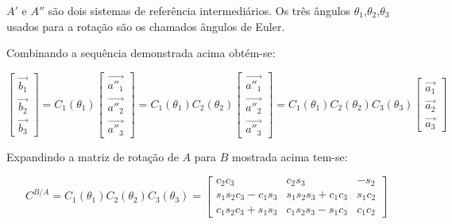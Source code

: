 \begin{math}A'\end{math} e \begin{math}A''\end{math} são dois sistemas de referência intermediários. Os três ângulos \begin{math}\theta_1\end{math},\begin{math}\theta_2\end{math},\begin{math}\theta_3\end{math} usados para a rotação são os chamados  ângulos de Euler.

Combinando a sequência demonstrada acima obtém-se:

\begin{equation}\begin{bmatrix}
\vec{b_1} \\ \vec{b_2} \\ \vec{b_3}
\end{bmatrix}=
C_1(\theta_1)\begin{bmatrix}
\vec{a''_1} \\ \vec{a''_2} \\ \vec{a''_3}
\end{bmatrix}=
C_1(\theta_1)C_2(\theta_2)\begin{bmatrix}
\vec{a''_1} \\ \vec{a''_2} \\ \vec{a''_3}
\end{bmatrix}=
C_1(\theta_1)C_2(\theta_2)C_3(\theta_3)\begin{bmatrix}
\vec{a_1} \\ \vec{a_2} \\ \vec{a_3}
\end{bmatrix}
\end{equation}

Expandindo a matriz de rotação de \begin{math}A\end{math} para \begin{math}B\end{math} mostrada acima tem-se:

\begin{equation}
C^{B/A}=C_1(\theta_1)C_2(\theta_2)C_3(\theta_3)=
\begin{bmatrix}
c_2c_3 & c_2s_3 & -s_2 \\
s_1s_2c_3-c_1s_3 & s_1s_2s_3+c_1c_3 & s_1c_2 \\
c_1s_2c_3+s_1s_3 & c_1s_2s_3-s_1c_3 & c_1c_2
\end{bmatrix}
\end{equation}

